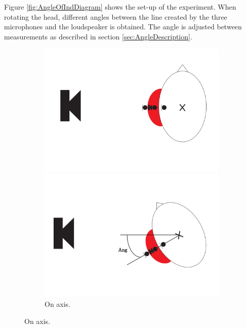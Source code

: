 Figure \ref{fig:AngleOfIndDiagram} shows the set-up of the experiment. When rotating the head, different angles between the line created by the three microphones and the loudspeaker is obtained. The angle is adjusted between measurements as described in section \ref{sec:AngleDescription}. %
\begin{figure}[H]
	\centering
	\begin{subfigure}[b]{.4\textwidth}
		\includegraphics[width=\textwidth]{../Journal/Experiments/AngleOfIncidence/AngleOfIncidenceOnAxis.pdf}
		\caption{On axis.}
		\label{fig:AngOfIndOnax}
		\vspace{2ex}
		\includegraphics[width=\textwidth]{../Journal/Experiments/AngleOfIncidence/AngleOfIncidenceOffAxis.pdf}

\end{subfigure}
\end{figure}
